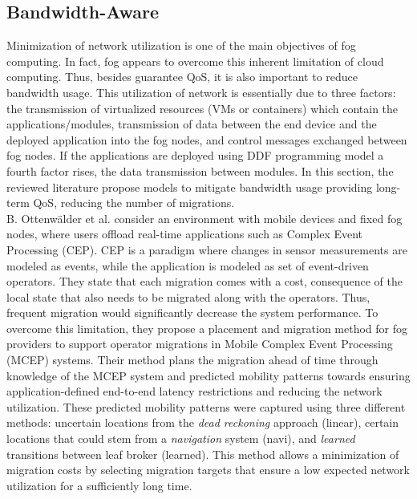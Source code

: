 \subsection{Bandwidth-Aware}\label{sec:bandwidth}
Minimization of network utilization is one of the main objectives of fog computing. In fact, fog appears to overcome this inherent limitation of cloud computing. Thus, besides guarantee QoS, it is also  important to reduce bandwidth usage. This utilization of network is essentially due to three factors: the transmission of virtualized resources (VMs or containers) which contain the applications/modules, transmission of data between the end device and the deployed application into the fog nodes, and control messages exchanged between fog nodes. If the applications are deployed using DDF programming model a fourth factor rises, the data transmission between modules. In this section, the reviewed literature propose models to mitigate bandwidth usage providing long-term QoS, reducing the number of migrations.\\
\noindent\tab B. Ottenwälder et al. \cite{ottenwalder2013migcep} consider an environment with mobile devices and fixed fog nodes, where users offload real-time applications such as Complex Event Processing (CEP). CEP is a paradigm where changes in sensor measurements are modeled as events, while the application is modeled as set of event-driven operators. They state that each migration comes with a cost, consequence of the local state that also needs to be migrated along with the operators. Thus, frequent migration would significantly decrease the system performance. To overcome this limitation, they propose a placement and migration method for fog providers to support operator migrations in Mobile Complex Event Processing (MCEP) systems. Their method plans the migration ahead of time through knowledge of the MCEP system and predicted mobility patterns towards ensuring application-defined end-to-end latency restrictions and reducing the network utilization. These predicted mobility patterns were captured using three different methods: uncertain locations from the \textit{dead reckoning} approach (linear), certain locations that could stem from a \textit{navigation} system (navi), and \textit{learned} transitions between leaf broker (learned). This method allows a minimization of migration costs by selecting migration targets that ensure a low expected network utilization for a sufficiently long time.\\ %
